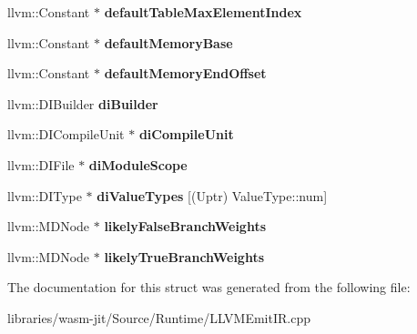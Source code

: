 \begin{DoxyCompactItemize}
llvm\+::\+Constant $\ast$ {\bfseries default\+Table\+Max\+Element\+Index}
\item 
\mbox{\label{struct_l_l_v_m_j_i_t_1_1_emit_module_context_ad6cafeea08a7a577bd40d0b68ae23ada}} 
llvm\+::\+Constant $\ast$ {\bfseries default\+Memory\+Base}
\item 
\mbox{\label{struct_l_l_v_m_j_i_t_1_1_emit_module_context_a0fb87335c7fa2f217b27e76e6fad94c2}} 
llvm\+::\+Constant $\ast$ {\bfseries default\+Memory\+End\+Offset}
\item 
\mbox{\label{struct_l_l_v_m_j_i_t_1_1_emit_module_context_a89925b0fb1ea91022c4a85cfd12787c2}} 
llvm\+::\+D\+I\+Builder {\bfseries di\+Builder}
\item 
\mbox{\label{struct_l_l_v_m_j_i_t_1_1_emit_module_context_affb2f5d94856ddceb642c909c7c8a49c}} 
llvm\+::\+D\+I\+Compile\+Unit $\ast$ {\bfseries di\+Compile\+Unit}
\item 
\mbox{\label{struct_l_l_v_m_j_i_t_1_1_emit_module_context_a060223bb8bb93056783f03da369580d7}} 
llvm\+::\+D\+I\+File $\ast$ {\bfseries di\+Module\+Scope}
\item 
\mbox{\label{struct_l_l_v_m_j_i_t_1_1_emit_module_context_afec16844f56ebd233facac483c00fd94}} 
llvm\+::\+D\+I\+Type $\ast$ {\bfseries di\+Value\+Types} \mbox{[}(Uptr) Value\+Type\+::num\mbox{]}
\item 
\mbox{\label{struct_l_l_v_m_j_i_t_1_1_emit_module_context_a538526e9cb296990ab09a01bb8daff63}} 
llvm\+::\+M\+D\+Node $\ast$ {\bfseries likely\+False\+Branch\+Weights}
\item 
\mbox{\label{struct_l_l_v_m_j_i_t_1_1_emit_module_context_af1fc431139626b1976d24629c25a6c29}} 
llvm\+::\+M\+D\+Node $\ast$ {\bfseries likely\+True\+Branch\+Weights}
\end{DoxyCompactItemize}


The documentation for this struct was generated from the following file\+:\begin{DoxyCompactItemize}
\item 
libraries/wasm-\/jit/\+Source/\+Runtime/L\+L\+V\+M\+Emit\+I\+R.\+cpp\end{DoxyCompactItemize}
